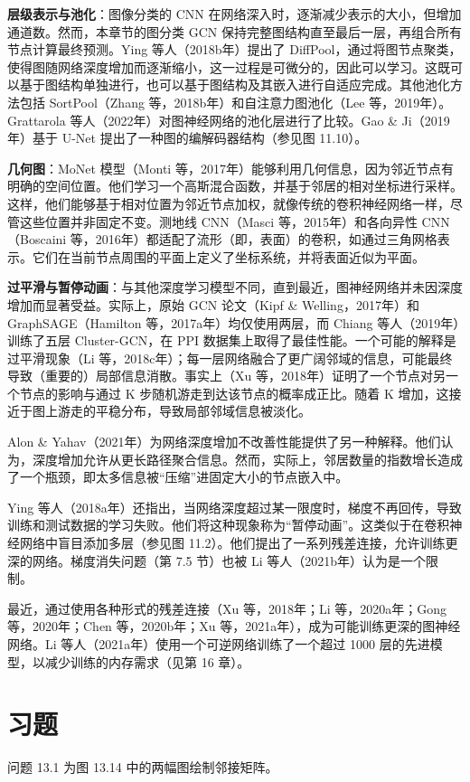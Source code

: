 \documentclass[lang=cn,newtx,10pt,scheme=chinese]{elegantbook}
\begin{document}
\textbf{层级表示与池化}：图像分类的 CNN 在网络深入时，逐渐减少表示的大小，但增加通道数。然而，本章节的图分类 GCN 保持完整图结构直至最后一层，再组合所有节点计算最终预测。Ying 等人（2018b年）提出了 DiffPool，通过将图节点聚类，使得图随网络深度增加而逐渐缩小，这一过程是可微分的，因此可以学习。这既可以基于图结构单独进行，也可以基于图结构及其嵌入进行自适应完成。其他池化方法包括 SortPool（Zhang 等，2018b年）和自注意力图池化（Lee 等，2019年）。Grattarola 等人（2022年）对图神经网络的池化层进行了比较。Gao \& Ji（2019年）基于 U-Net 提出了一种图的编解码器结构（参见图 11.10）。

\textbf{几何图}：MoNet 模型（Monti 等，2017年）能够利用几何信息，因为邻近节点有明确的空间位置。他们学习一个高斯混合函数，并基于邻居的相对坐标进行采样。这样，他们能够基于相对位置为邻近节点加权，就像传统的卷积神经网络一样，尽管这些位置并非固定不变。测地线 CNN（Masci 等，2015年）和各向异性 CNN（Boscaini 等，2016年）都适配了流形（即，表面）的卷积，如通过三角网格表示。它们在当前节点周围的平面上定义了坐标系统，并将表面近似为平面。

\textbf{过平滑与暂停动画}：与其他深度学习模型不同，直到最近，图神经网络并未因深度增加而显著受益。实际上，原始 GCN 论文（Kipf \& Welling，2017年）和 GraphSAGE（Hamilton 等，2017a年）均仅使用两层，而 Chiang 等人（2019年）训练了五层 Cluster-GCN，在 PPI 数据集上取得了最佳性能。一个可能的解释是过平滑现象（Li 等，2018c年）；每一层网络融合了更广阔邻域的信息，可能最终导致（重要的）局部信息消散。事实上（Xu 等，2018年）证明了一个节点对另一个节点的影响与通过 K 步随机游走到达该节点的概率成正比。随着 K 增加，这接近于图上游走的平稳分布，导致局部邻域信息被淡化。

Alon \& Yahav（2021年）为网络深度增加不改善性能提供了另一种解释。他们认为，深度增加允许从更长路径聚合信息。然而，实际上，邻居数量的指数增长造成了一个瓶颈，即太多信息被“压缩”进固定大小的节点嵌入中。

Ying 等人（2018a年）还指出，当网络深度超过某一限度时，梯度不再回传，导致训练和测试数据的学习失败。他们将这种现象称为“暂停动画”。这类似于在卷积神经网络中盲目添加多层（参见图 11.2）。他们提出了一系列残差连接，允许训练更深的网络。梯度消失问题（第 7.5 节）也被 Li 等人（2021b年）认为是一个限制。

最近，通过使用各种形式的残差连接（Xu 等，2018年；Li 等，2020a年；Gong 等，2020年；Chen 等，2020b年；Xu 等，2021a年），成为可能训练更深的图神经网络。Li 等人（2021a年）使用一个可逆网络训练了一个超过 1000 层的先进模型，以减少训练的内存需求（见第 16 章）。

\section{习题}
问题 13.1 为图 13.14 中的两幅图绘制邻接矩阵。
\end{document}
